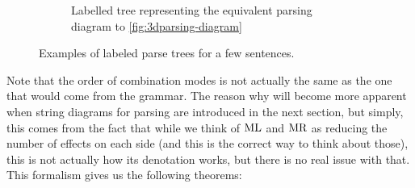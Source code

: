 \begin{figure}
	\begin{subfigure}{.45\textwidth}
		\centering
		\caption{Labelled tree representing the equivalent parsing diagram to
			\ref{fig:3dparsing-diagram}}
		\label{fig:tree-rain}
	\end{subfigure}
	\caption{Examples of labeled parse trees for a few sentences.}
	\label{fig:parsing-trees}
\end{figure}
Note that the order of combination modes is not actually the same as the one
that would come from the grammar.
The reason why will become more apparent when string diagrams for parsing are
introduced in the next section, but simply, this comes from the fact that while
we think of $\text{ML}$ and $\text{MR}$ as reducing the number of effects on each
side (and this is the correct way to think about those), this is not actually
how its denotation works, but there is no real issue with that.
This formalism gives us the following theorems:

